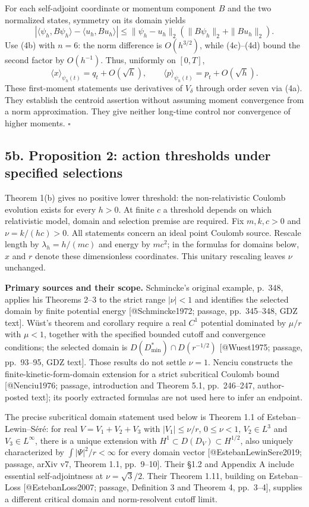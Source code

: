 \documentclass[11pt,a4paper]{article}
\begin{document}
For each self-adjoint coordinate or momentum component \(B\) and the two
normalized states, symmetry on its domain yields
\[|\langle\psi_h,B\psi_h\rangle-\langle u_h,Bu_h\rangle|
\le\|\psi_h-u_h\|_2(\|B\psi_h\|_2+\|Bu_h\|_2).\] Use (4b) with \(n=6\):
the norm difference is \(O(h^{3/2})\), while (4c)--(4d) bound the second
factor by \(O(h^{-1})\). Thus, uniformly on \([0,T]\),
\[\langle x\rangle_{\psi_h(t)}=q_t+O(\sqrt h),\qquad
\langle p\rangle_{\psi_h(t)}=p_t+O(\sqrt h).\tag{4e}\] These
first-moment statements use derivatives of \(V_\delta\) through order
seven via (4a). They establish the centroid assertion without assuming
moment convergence from a norm approximation. They give neither
long-time control nor convergence of higher moments. \(\square\)

\subsection{5b. Proposition 2: action thresholds under specified
selections}\label{b.-proposition-2-action-thresholds-under-specified-selections}

Theorem 1(b) gives no positive lower threshold: the non-relativistic
Coulomb evolution exists for every \(h>0\). At finite \(c\) a threshold
depends on which relativistic model, domain and selection premise are
required. Fix \(m,k,c>0\) and \(\nu=k/(hc)>0\). All statements concern
an ideal point Coulomb source. Rescale length by \(\lambda_h=h/(mc)\)
and energy by \(mc^2\); in the formulas for domains below, \(x\) and
\(r\) denote these dimensionless coordinates. This unitary rescaling
leaves \(\nu\) unchanged.

\textbf{Primary sources and their scope.} Schmincke's original example,
p.~348, applies his Theorems 2--3 to the strict range \(|\nu|<1\) and
identifies the selected domain by finite potential energy
{[}@Schmincke1972; passage, pp.~345--348, GDZ text{]}. Wüst's theorem
and corollary require a real \(C^1\) potential dominated by \(\mu/r\)
with \(\mu<1\), together with the specified bounded cutoff and
convergence conditions; the selected domain is
\(D(D_{\min}^*)\cap D(r^{-1/2})\) {[}@Wuest1975; passage, pp.~93--95,
GDZ text{]}. Those results do not settle \(\nu=1\). Nenciu constructs
the finite-kinetic-form-domain extension for a strict subcritical
Coulomb bound {[}@Nenciu1976; passage, introduction and Theorem 5.1,
pp.~246--247, author-posted text{]}; its poorly extracted formulas are
not used here to infer an endpoint.

The precise subcritical domain statement used below is Theorem 1.1 of
Esteban--Lewin--Séré: for real \(V=V_1+V_2+V_3\) with \(|V_1|\le\nu/r\),
\(0\le\nu<1\), \(V_2\in L^3\) and \(V_3\in L^\infty\), there is a unique
extension with \(H^1\subset D(D_V)\subset H^{1/2}\), also uniquely
characterized by \(\int|\Psi|^2/r<\infty\) for every domain vector
{[}@EstebanLewinSere2019; passage, arXiv v7, Theorem 1.1, pp.~9--10{]}.
Their §1.2 and Appendix A include essential self-adjointness at
\(\nu=\sqrt3/2\). Their Theorem 1.11, building on Esteban--Loss
{[}@EstebanLoss2007; passage, Definition 3 and Theorem 4, pp.~3--4{]},
supplies a different critical domain and norm-resolvent cutoff limit.
\end{document}

